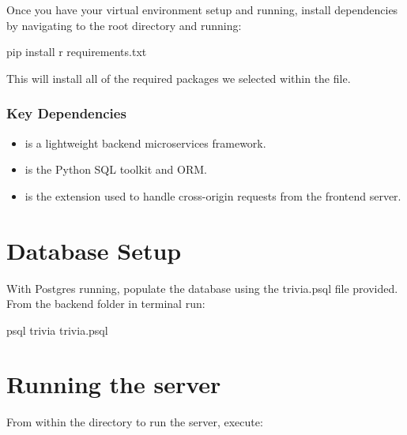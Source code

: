 \documentclass[letterpaper,10pt,english]{sphinxmanual}
\begin{document}
Once you have your virtual environment setup and running, install dependencies by navigating to the root directory and running:

\begin{sphinxVerbatim}[commandchars=\\\{\}]
pip install \PYGZhy{}r requirements.txt
\end{sphinxVerbatim}

This will install all of the required packages we selected within the  file.


\subsubsection{Key Dependencies}
\label{\detokenize{index:key-dependencies}}\begin{itemize}
\item {} 
  is a lightweight backend microservices framework.

\item {} 
 is the Python SQL toolkit and ORM.

\item {} 
 is the extension used to handle cross-origin requests from the frontend server.

\end{itemize}


\section{Database Setup}
\label{\detokenize{index:database-setup}}
With Postgres running, populate the database using the trivia.psql file provided. From the backend folder in terminal run:

\begin{sphinxVerbatim}[commandchars=\\\{\}]
psql trivia \PYGZlt{} trivia.psql
\end{sphinxVerbatim}


\section{Running the server}
\label{\detokenize{index:running-the-server}}
From within the  directory to run the server, execute:
\end{document}
